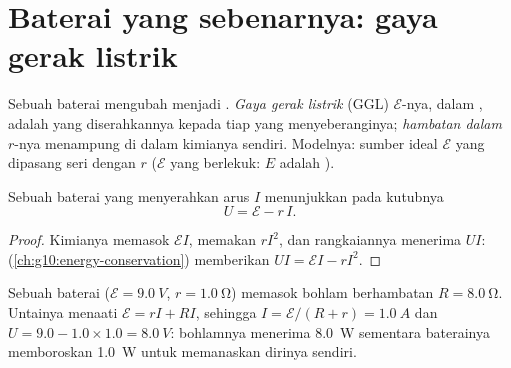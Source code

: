 \section{Baterai yang sebenarnya: gaya gerak listrik}

\begin{definition}\label{def:g11:circuits-and-power:emf}
Sebuah baterai mengubah  menjadi . \emph{Gaya
gerak listrik} (GGL) $\mathcal{E}$-nya, dalam
, adalah  yang diserahkannya kepada tiap  yang
menyeberanginya; \emph{hambatan dalam} $r$-nya
menampung  di dalam kimianya sendiri. Modelnya: sumber ideal
$\mathcal{E}$ yang dipasang seri dengan $r$ ($\mathcal{E}$ yang
berlekuk: $E$ adalah ).
\end{definition}

\begin{proposition}\label{prop:g11:circuits-and-power:terminal}
Sebuah baterai yang menyerahkan arus $I$ menunjukkan pada kutubnya
\[ U = \mathcal{E} - r\,I . \]
\end{proposition}

\begin{proof}
Kimianya memasok $\mathcal{E}I$,  memakan $rI^2$, dan
rangkaiannya menerima $UI$: 
(\cref{ch:g10:energy-conservation}) memberikan
$UI = \mathcal{E}I - rI^2$.
\end{proof}

\begin{example}\label{ex:g11:circuits-and-power:discharge}
Sebuah baterai ($\mathcal{E} = \qty{9.0}{V}$, $r = \qty{1.0}{\ohm}$)
memasok bohlam berhambatan $R = \qty{8.0}{\ohm}$. Untainya menaati
$\mathcal{E} =
rI + RI$, sehingga $I = \mathcal{E}/(R + r) = \qty{1.0}{A}$
dan $U = 9.0 -
1.0 \times 1.0 = \qty{8.0}{V}$: bohlamnya menerima
\qty{8.0}{W} sementara baterainya memboroskan \qty{1.0}{W} untuk
memanaskan dirinya sendiri.
\end{example}

